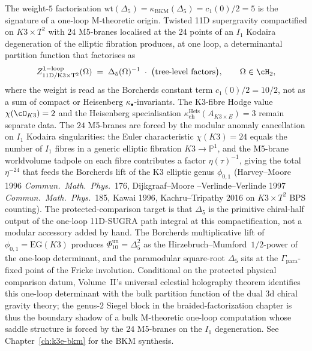 \begin{remark}
\label{rem:brf-delta5-11d-sugra-k3-t2}
The weight-$5$ factorisation
$\mathrm{wt}(\Delta_5)=\kappa_{\mathrm{BKM}}(\Delta_5)=c_1(0)/2=5$
is the signature of a one-loop M-theoretic origin. Twisted 11D supergravity compactified on
$K3 \times T^2$ with $24$ M5-branes localised at the $24$ points of
an $I_1$ Kodaira degeneration of the elliptic fibration produces,
at one loop, a determinantal partition function that factorises as
\[
 Z^{\mathrm{1-loop}}_{\mathrm{11D/K3 \times T^2}}(\Omega)
 \;=\;
 \Delta_5(\Omega)^{-1}
 \;\cdot\; \bigl(\text{tree-level factors}\bigr),
 \qquad \Omega \in \cH_2,
\]
where the weight is read as the Borcherds constant term
$c_1(0)/2=10/2$, not as a sum of compact or Heisenberg
$\kappa_\bullet$-invariants. The K3-fibre Hodge value
$\chi(\cO_{K3})=2$ and the Heisenberg specialisation
$\kappa_{\mathrm{ch}}^{\mathrm{Heis}}(A_{K3 \times E})=3$ remain
separate data. The $24$ M5-branes are forced by the
modular anomaly cancellation on $I_1$ Kodaira singularities: the
Euler characteristic $\chi(K3) = 24$ equals the number of $I_1$
fibres in a generic elliptic fibration $K3 \to \mathbb{P}^1$, and
the M5-brane worldvolume tadpole on each fibre contributes a
factor $\eta(\tau)^{-1}$, giving the total $\eta^{-24}$ that feeds
the Borcherds lift of the K3 elliptic genus $\phi_{0,1}$
(Harvey--Moore 1996 \emph{Commun.~Math.~Phys.}~176, Dijkgraaf--Moore
--Verlinde--Verlinde 1997 \emph{Commun.~Math.~Phys.}~185,
Kawai 1996, Kachru--Tripathy 2016 on $K3 \times T^2$ BPS counting).
The protected-comparison target is that $\Delta_5$ is the primitive
chiral-half output of the one-loop 11D-SUGRA path integral at this
compactification, not a modular accessory added by hand. The Borcherds multiplicative lift
of $\phi_{0,1} = \mathrm{EG}(K3)$ produces
$\Phi_{10}^{\mathrm{un}} = \Delta_5^2$
as the Hirzebruch--Mumford~$1/2$-power of the one-loop determinant,
and the paramodular square-root $\Delta_5$ sits at the
$\Gamma_{\mathrm{para}}$-fixed point of the Fricke involution.
Conditional on the protected physical comparison datum, Volume~II's
universal celestial holography theorem identifies this one-loop
determinant with the bulk partition function of the dual 3d chiral
gravity theory; the genus-$2$ Siegel block in the
braided-factorization chapter is thus the boundary shadow of a
bulk M-theoretic one-loop computation whose saddle structure is
forced by the $24$ M5-branes on the $I_1$ degeneration. See
Chapter~\ref{ch:k3e-bkm} for the BKM synthesis.
\end{remark}

